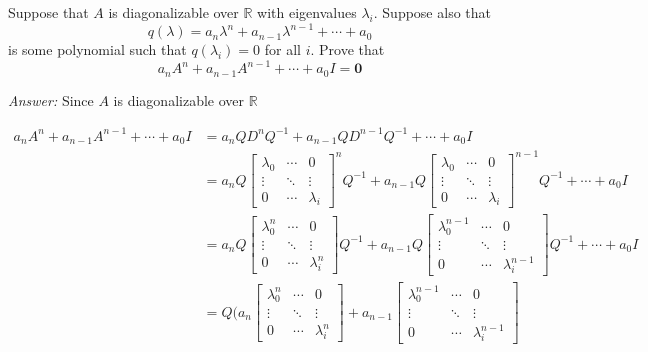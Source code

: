\documentclass[letterpaper]{article}
\newcommand{\ans}{\textit{Answer: }}
\newenvironment{question}[2][Question]{\begin{trivlist}
\item[\hskip \labelsep {\bfseries #1}\hskip \labelsep {\bfseries #2.}]}{\end{trivlist}}
\begin{document}
\begin{question}{5.36}
  Suppose that $A$ is diagonalizable over $\mathbb{R}$ with eigenvalues $\lambda_{i} .$ Suppose also
  that
  $$q(\lambda)=a_{n} \lambda^{n}+a_{n-1} \lambda^{n-1}+\cdots+a_{0}$$
  is some polynomial such that $q\left(\lambda_{i}\right)=0$ for all $i .$ Prove that
  $$a_{n} A^{n}+a_{n-1} A^{n-1}+\cdots+a_{0} I=\mathbf{0}$$

  \ans Since $A$ is diagonalizable over $\mathbb{R}$

  \begin{align*}
    a_{n} A^{n}+a_{n-1} A^{n-1}+\cdots+a_{0} I&=a_{n} QD^nQ^{-1}+a_{n-1} QD^{n-1}Q^{-1}+\cdots+a_{0} I \\
    &= a_{n} Q
    \left[ \begin{array}{ccc}{\lambda_0} & {\cdots} & {0} \\ {\vdots} & {\ddots} & {\vdots} \\ {0} & {\cdots} & {\lambda_i}\end{array}\right]^n
    Q^{-1}+a_{n-1} Q
    \left[ \begin{array}{ccc}{\lambda_0} & {\cdots} & {0} \\ {\vdots} & {\ddots} & {\vdots} \\ {0} & {\cdots} & {\lambda_i}\end{array}\right]^{n-1}
    Q^{-1}+\cdots+a_{0} I \\
    &= a_{n} Q
    \left[ \begin{array}{ccc}{\lambda_0^n} & {\cdots} & {0} \\ {\vdots} & {\ddots} & {\vdots} \\ {0} & {\cdots} & {\lambda_i^n}\end{array}\right]
    Q^{-1}+a_{n-1} Q
    \left[ \begin{array}{ccc}{\lambda_0^{n-1}} & {\cdots} & {0} \\ {\vdots} & {\ddots} & {\vdots} \\ {0} & {\cdots} & {\lambda_i^{n-1}}\end{array}\right]
    Q^{-1}+\cdots+a_{0} I \\
    &= Q ( a_{n}
    \left[ \begin{array}{ccc}{\lambda_0^n} & {\cdots} & {0} \\ {\vdots} & {\ddots} & {\vdots} \\ {0} & {\cdots} & {\lambda_i^n}\end{array}\right]
    +a_{n-1}
    \left[ \begin{array}{ccc}{\lambda_0^{n-1}} & {\cdots} & {0} \\ {\vdots} & {\ddots} & {\vdots} \\ {0} & {\cdots} & {\lambda_i^{n-1}}\end{array}\right]

\end{align*}
\end{question}
\end{document}
